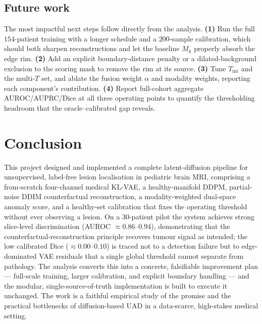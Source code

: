 \documentclass[12pt, a4paper]{article}
\begin{document}
\subsection{Future work}
The most impactful next steps follow directly from the analysis. \textbf{(1)} Run the full $154$-patient training with a longer schedule and a $200$-sample calibration, which should both sharpen reconstructions and let the baseline $M_k$ properly absorb the edge rim. \textbf{(2)} Add an explicit boundary-distance penalty or a dilated-background exclusion to the scoring mask to remove the rim at its source. \textbf{(3)} Tune $T_{\text{int}}$ and the multi-$T$ set, and ablate the fusion weight $\alpha$ and modality weights, reporting each component's contribution. \textbf{(4)} Report full-cohort aggregate AUROC/AUPRC/Dice at all three operating points to quantify the thresholding headroom that the oracle--calibrated gap reveals.

\section{Conclusion}
This project designed and implemented a complete latent-diffusion pipeline for unsupervised, label-free lesion localisation in pediatric brain MRI, comprising a from-scratch four-channel medical KL-VAE, a healthy-manifold DDPM, partial-noise DDIM counterfactual reconstruction, a modality-weighted dual-space anomaly score, and a healthy-set calibration that fixes the operating threshold without ever observing a lesion. On a 30-patient pilot the system achieves strong slice-level discrimination (AUROC $\approx 0.86$--$0.94$), demonstrating that the counterfactual-reconstruction principle recovers tumour signal as intended; the low calibrated Dice ($\approx 0.00$--$0.10$) is traced not to a detection failure but to edge-dominated VAE residuals that a single global threshold cannot separate from pathology. The analysis converts this into a concrete, falsifiable improvement plan — full-scale training, larger calibration, and explicit boundary handling — and the modular, single-source-of-truth implementation is built to execute it unchanged. The work is a faithful empirical study of the promise and the practical bottlenecks of diffusion-based UAD in a data-scarce, high-stakes medical setting.
\end{document}
